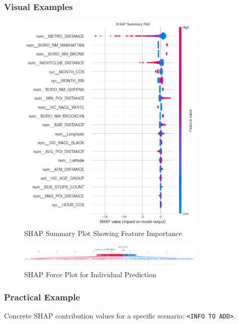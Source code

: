 \documentclass{article}
\begin{document}
\subsubsection{Visual Examples}

\begin{figure}[H]
\centering
\includegraphics[width=0.8\textwidth]{LogisticRegression_shap_summary.png}
\caption{SHAP Summary Plot Showing Feature Importance}
\end{figure}

\begin{figure}[H]
\centering
\includegraphics[width=0.8\textwidth]{LogisticRegression_shap_force.png}
\caption{SHAP Force Plot for Individual Prediction}
\end{figure}

\subsubsection{Practical Example}
Concrete SHAP contribution values for a specific scenario: \texttt{<INFO TO ADD>}.
\end{document}

